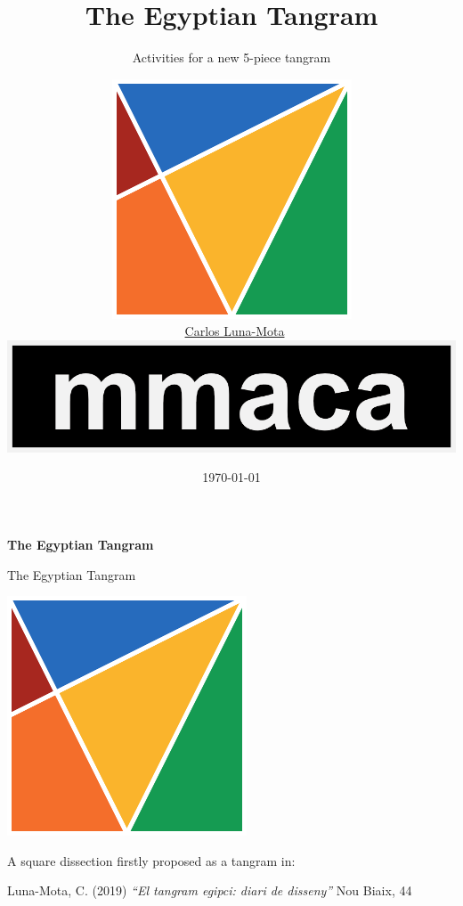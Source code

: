 \documentclass[14pt]{beamer}
\title{The Egyptian Tangram}
\subtitle{Activities for a new 5-piece tangram\vspace{-1.0em}}
\author{
    \includegraphics[height=15ex]{figures/figure001a.pdf}\\
    \vspace{0.75em}
    {\small \textcopyright\ \href{https://github.com/CarlosLunaMota}{Carlos Luna-Mota}}\\
    \vspace{0.75em}
    \href{https://mmaca.cat/}{\includegraphics[width=10ex]{figures/logo.png}}\\
    \vspace{-1.75em}}
\date{\today}
\begin{document}

    \begin{frame}
      \titlepage
    \end{frame} 


    \begin{frame}{}
        \begin{center}
            \textbf{\huge The Egyptian Tangram}
        \end{center}
    \end{frame}


    \begin{frame}{The Egyptian Tangram}
        \begin{center}
            \includegraphics[height=20ex]{figures/figure001a.pdf} \\

            \bigskip

            A square dissection firstly proposed as a tangram in:

            \bigskip
            
            {\footnotesize Luna-Mota, C. (2019) \emph{``El tangram egipci: diari de disseny''} Nou Biaix, 44}
        \end{center}
    \end{frame}

\end{document}

